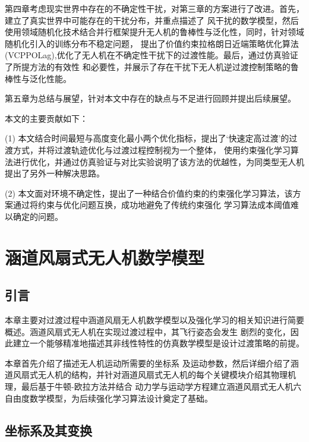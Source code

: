 第四章考虑现实世界中存在的不确定性干扰，对第三章的方案进行了改进。首先，建立了真实世界中可能存在的干扰分布，并重点描述了
风干扰的数学模型，然后使用领域随机化技术结合并行框架提升无人机的鲁棒性与泛化性，同时，针对领域随机化引入的训练分布不稳定问题，
提出了价值约束拉格朗日近端策略优化算法(VCPPOLag),优化了无人机在不确定性干扰下的过渡性能。最后，通过仿真验证了所提方法的有效性
和必要性，并展示了存在干扰下无人机逆过渡控制策略的鲁棒性与泛化性能。

第五章为总结与展望，针对本文中存在的缺点与不足进行回顾并提出后续展望。

本文的主要贡献如下：

(1) 本文结合时间最短与高度变化最小两个优化指标，提出了‘快速定高过渡’的过渡方式，并将过渡轨迹优化与过渡过程控制视为一个整体，
使用约束强化学习算法进行优化，并通过仿真验证与对比实验说明了该方法的优越性，为同类型无人机提出了另外一种解决思路。

(2) 本文面对环境不确定性，提出了一种结合价值约束的约束强化学习算法，该方案通过将约束与优化问题互换，成功地避免了传统约束强化
学习算法成本阈值难以确定的问题。
\chapter{涵道风扇式无人机数学模型}
\section{引言}
本章主要对过渡过程中涵道风扇无人机数学模型以及强化学习的相关知识进行简要概述。涵道风扇式无人机在实现过渡过程中，其飞行姿态会发生
剧烈的变化，因此建立一个能够精准地描述其非线性特性的仿真数学模型是设计过渡策略的前提。

本章首先介绍了描述无人机运动所需要的坐标系
及运动参数，然后详细介绍了涵道风扇式无人机的结构，并针对涵道风扇式无人机的每个关键模块介绍其物理机理，最后基于牛顿-欧拉方法并结合
动力学与运动学方程建立涵道风扇式无人机六自由度数学模型，为后续强化学习算法设计奠定了基础。
\section{坐标系及其变换}

